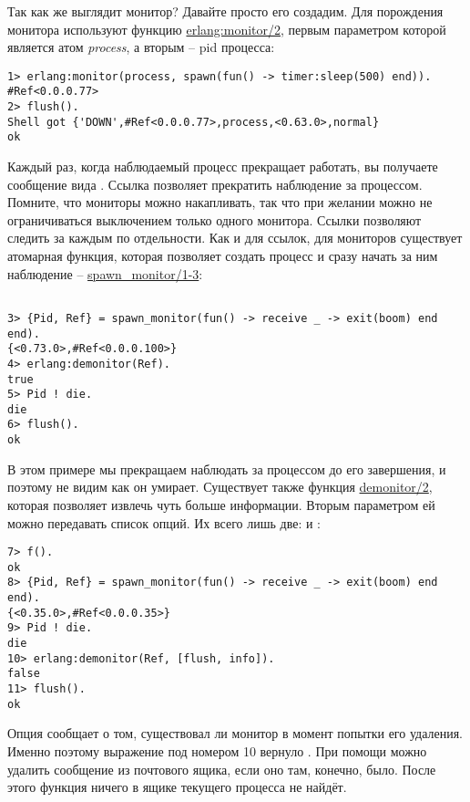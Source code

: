 Так как же выглядит монитор?
Давайте просто его создадим.
Для порождения монитора используют функцию \href{http://erldocs.com/R15B/erts/erlang.html\#monitor/2}{erlang:monitor/2}, первым параметром которой является атом \emph{process}, а вторым \--- pid процесса:
\begin{lstlisting}[style=erlang]
1> erlang:monitor(process, spawn(fun() -> timer:sleep(500) end)).
#Ref<0.0.0.77>
2> flush().
Shell got {'DOWN',#Ref<0.0.0.77>,process,<0.63.0>,normal}
ok
\end{lstlisting}

Каждый раз, когда наблюдаемый процесс прекращает работать, вы получаете сообщение вида .
Ссылка позволяет прекратить наблюдение за процессом.
Помните, что мониторы можно накапливать, так что при желании можно не ограничиваться выключением только одного монитора.
Ссылки позволяют следить за каждым по отдельности.
Как и для ссылок, для мониторов существует атомарная функция, которая позволяет создать процесс и сразу начать за ним наблюдение \--- \href{http://erldocs.com/R15B/erts/erlang.html\#spawn_monitor/1}{spawn\_monitor/1-3}:
\begin{lstlisting}[style=erlang]

3> {Pid, Ref} = spawn_monitor(fun() -> receive _ -> exit(boom) end end).
{<0.73.0>,#Ref<0.0.0.100>}
4> erlang:demonitor(Ref).
true
5> Pid ! die.
die
6> flush().
ok
\end{lstlisting}

В этом примере мы прекращаем наблюдать за процессом до его завершения, и поэтому не видим как он умирает.
Существует также функция \href{http://erldocs.com/R15B/erts/erlang.html\#demonitor/2}{demonitor/2}, которая позволяет извлечь чуть больше информации.
Вторым параметром ей можно передавать список опций.
Их всего лишь две:  и :
\begin{lstlisting}[style=erlang]
7> f().
ok
8> {Pid, Ref} = spawn_monitor(fun() -> receive _ -> exit(boom) end end).
{<0.35.0>,#Ref<0.0.0.35>}
9> Pid ! die.
die
10> erlang:demonitor(Ref, [flush, info]).
false
11> flush().
ok
\end{lstlisting}

Опция  сообщает о том, существовал ли монитор в момент попытки его удаления.
Именно поэтому выражение под номером 10 вернуло .
При помощи  можно удалить сообщение  из почтового ящика, если оно там, конечно, было.
После этого функция  ничего в ящике текущего процесса не найдёт.
